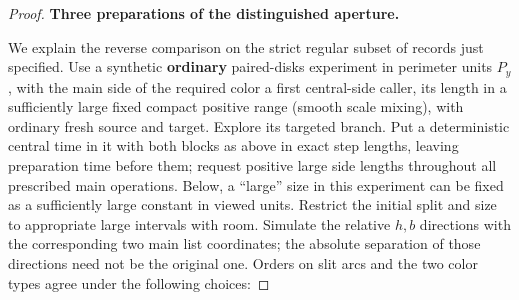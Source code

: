 \begin{proof}

\smallskip
\noindent\textbf{Three preparations of the distinguished aperture.}\quad

We explain the reverse comparison on the strict regular subset of records just specified.
Use a synthetic \textbf{ordinary} paired-disks experiment in perimeter units \(P_y\), with
the main side of the required color a first central-side caller, its length in a
sufficiently large fixed compact positive range (smooth scale mixing), with ordinary fresh
source and target. Explore its targeted branch. Put a deterministic central time in it
with both blocks as above in exact step lengths, leaving preparation time before them;
request positive large side lengths throughout all prescribed main operations. Below, a
``large'' size in this experiment can be fixed as a sufficiently large constant in viewed
units. Restrict the initial split and size to appropriate large intervals with room.
Simulate the relative \(h,b\) directions with the corresponding two main list coordinates;
the absolute separation of those directions need not be the original one. Orders on slit
arcs and the two color types agree under the following choices:


\end{proof}
